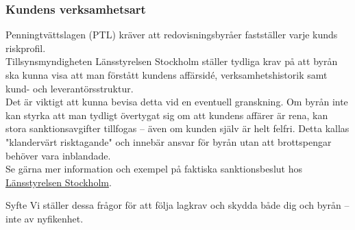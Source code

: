 \documentclass[10pt]{beamer}
\begin{document}
\begin{frame}[label=verksamhet]
  \frametitle{Kundens verksamhetsart}

  \small
  Penningtvättslagen (PTL) kräver att redovisningsbyråer fastställer varje kunds riskprofil.\\
  Tillsynsmyndigheten Länsstyrelsen Stockholm ställer tydliga krav på att byrån ska kunna visa att man förstått kundens affärsidé, verksamhetshistorik samt kund- och leverantörsstruktur.\\
  Det är viktigt att kunna bevisa detta vid en eventuell granskning. Om byrån inte kan styrka att man tydligt övertygat sig om att kundens affärer är rena, kan stora sanktionsavgifter tillfogas – även om kunden själv är helt felfri. Detta kallas "klandervärt risktagande" och innebär ansvar för byrån utan att brottspengar behöver vara inblandade.\\
  Se gärna mer information och exempel på faktiska sanktionsbeslut hos 
  \href{https://www.lansstyrelsen.se/stockholm/samhalle/betalning-ekonomi-och-pengar/forhindra-penningtvatt-och-finansiering-av-terrorism/ingripanden-och-sanktioner-penningtvatt.html}{Länsstyrelsen Stockholm}.

  \vspace{1cm}
  \begin{block}{Syfte}
    Vi ställer dessa frågor för att följa lagkrav och skydda både dig och byrån – inte av nyfikenhet.
  \end{block}

  \vspace{0.8cm}
  \begin{flushright}
    \hyperlink{nextslide}{}
  \end{flushright}
\end{frame}
\end{document}
